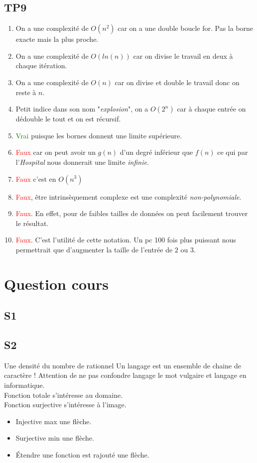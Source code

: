\documentclass{report}
\begin{document}
\section{TP9}
\begin{enumerate}
\item On a une complexité de $O(n^2)$ car on a une double boucle for. Pas la borne exacte mais la plus proche.
\item On a une complexité de $O(ln(n))$ car on divise le travail en deux à chaque itération.
\item On a une complexité de $O(n)$ car on divise et double le travail donc on reste à $n$.
\item Petit indice dans son nom "\textit{explosion}", on a $O(2^n)$ car à chaque entrée on dédouble le tout et on est récursif.
\item \textcolor{green}{Vrai} puisque les bornes donnent une limite supérieure.
\item \textcolor{red}{Faux} car on peut avoir un $g(n)$ d'un degré inférieur que $f(n)$ ce qui par l'\textit{Hospital} nous donnerait une limite \textit{infinie}.
\item \textcolor{red}{Faux} c'est en $O(n^3)$
\item \textcolor{red}{Faux}, être intrinsèquement complexe est une complexité \textit{non-polynomiale}.
\item \textcolor{red}{Faux}. En effet, pour de faibles tailles de données on peut facilement trouver le résultat.
\item \textcolor{red}{Faux}. C'est l'utilité de cette notation. Un pc 100 fois plus puissant nous permettrait que d'augmenter la taille de l'entrée de $2$ ou $3$.
\end{enumerate}

\chapter{Question cours}
\section{S1}

\section{S2}
Une densité du nombre de rationnel
Un langage est un ensemble de chaine de caractère ! Attention de ne pas confondre langage le mot vulgaire et langage en informatique.\\
Fonction totale s'intéresse au domaine.\\
Fonction surjective s'intéresse à l'image.\\
\begin{itemize}
\item Injective max une flèche.
\item Surjective min une flèche.
\item Étendre une fonction est rajouté une flèche.
\end{itemize}
\end{document}
